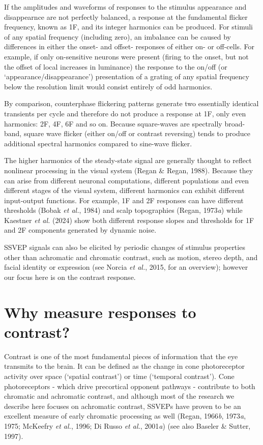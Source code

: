 \documentclass[
  letterpaper,
  DIV=11,
  numbers=noendperiod]{scrartcl}
\begin{document}
If the amplitudes and waveforms of responses to the stimulus appearance
and disappearnce are not perfectly balanced, a response at the
fundamental flicker frequency, known as 1F, and its integer harmonics
can be produced. For stimuli of any spatial frequency (including zero),
an imbalance can be caused by differences in either the onset- and
offset- responses of either on- or off-cells. For example, if only
on-sensitive neurons were present (firing to the onset, but not the
offset of local increases in luminance) the response to the on/off (or
`appearance/disappearance') presentation of a grating of any spatial
frequency below the resolution limit would consist entirely of odd
harmonics.

By comparison, counterphase flickering patterns generate two essentially
identical transients per cycle and therefore do not produce a response
at 1F, only even harmonics: 2F, 4F, 6F and so on. Because square-waves
are spectrally broad-band, square wave flicker (either on/off or
contrast reversing) tends to produce additional spectral harmonics
compared to sine-wave flicker.

The higher harmonics of the steady-state signal are generally thought to
reflect nonlinear processing in the visual system (Regan \& Regan,
1988). Because they can arise from different neuronal computations,
different populations and even different stages of the visual system,
different harmonics can exhibit different input-output functions. For
example, 1F and 2F responses can have different thresholds (Bobak
\emph{et al.}, 1984) and scalp topographies (Regan, 1973\emph{a}) while
Kaestner \emph{et al.} (2024) show both different response slopes and
thresholds for 1F and 2F components generated by dynamic noise.

SSVEP signals can also be elicited by periodic changes of stimulus
properties other than achromatic and chromatic contrast, such as motion,
stereo depth, and facial identity or expression (see Norcia \emph{et
al.}, 2015, for an overview); however our focus here is on the contrast
response.

\section{Why measure responses to
contrast?}\label{why-measure-responses-to-contrast}

Contrast is one of the most fundamental pieces of information that the
eye transmits to the brain. It can be defined as the change in cone
photoreceptor activity over space (`spatial contrast') or time
(`temporal contrast'). Cone photoreceptors - which drive precortical
opponent pathways - contribute to both chromatic and achromatic
contrast, and although most of the research we describe here focuses on
achromatic contrast, SSVEPs have proven to be an excellent measure of
early chromatic processing as well (Regan, 1966\emph{b}, 1973\emph{a},
1975; McKeefry \emph{et al.}, 1996; Di Russo \emph{et al.},
2001\emph{a}) (see also Baseler \& Sutter, 1997).
\end{document}
